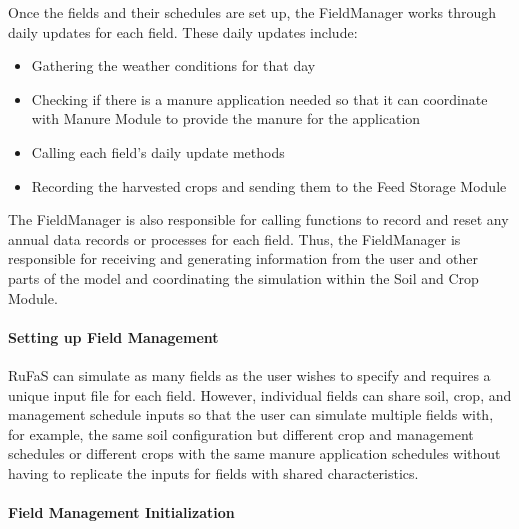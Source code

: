 Once the fields and their schedules are set up, the FieldManager works through daily updates for each field. These daily updates include:
\begin{itemize}
    \item Gathering the weather conditions for that day
    \item Checking if there is a manure application needed so that it can coordinate with Manure Module to provide the manure for the application
    \item Calling each field’s daily update methods
    \item Recording the harvested crops and sending them to the Feed Storage Module

\end{itemize}

The FieldManager is also responsible for calling functions to record and reset any annual data records or processes for each field. Thus, the FieldManager is responsible for receiving and generating information from the user and other parts of the model and coordinating the simulation within the Soil and Crop Module.

\paragraph{Setting up Field Management}
\vspace{-0.25cm}

RuFaS can simulate as many fields as the user wishes to specify and requires a unique input file for each field. However, individual fields can share soil, crop, and management schedule inputs so that the user can simulate multiple fields with, for example, the same soil configuration but different crop and management schedules or different crops with the same manure application schedules without having to replicate the inputs for fields with shared characteristics.

\paragraph{Field Management Initialization}
\vspace{-0.25cm}

